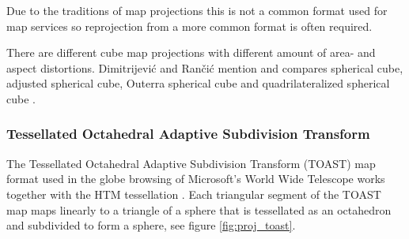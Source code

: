 Due to the traditions of map projections this is not a common format used for map services so reprojection from a more common format is often required.

There are different cube map projections with different amount of area- and aspect distortions. Dimitrijevi\'{c} and Ran\v{c}i\'{c} mention and compares spherical cube, adjusted spherical cube, Outerra spherical cube and quadrilateralized spherical cube \cite{dimi15}.

\subsubsection{Tessellated Octahedral Adaptive Subdivision Transform}

The Tessellated Octahedral Adaptive Subdivision Transform (TOAST) map format used in the globe browsing of Microsoft's World Wide Telescope works together with the HTM tessellation \cite{toast}. Each triangular segment of the TOAST map maps linearly to a triangle of a sphere that is tessellated as an octahedron and subdivided to form a sphere, see figure \ref{fig:proj_toast}.

